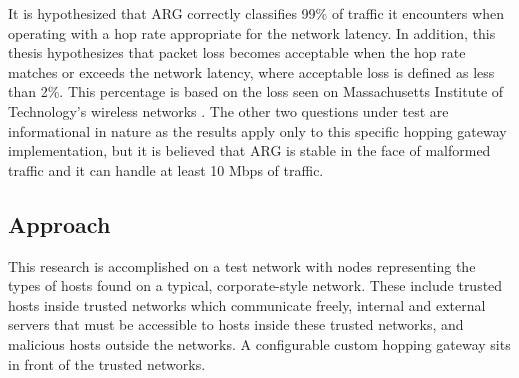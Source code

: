 

\par It is hypothesized that \ac{ARG} correctly classifies 99\% of traffic it encounters when operating with a hop rate appropriate for the network latency. In addition, this thesis hypothesizes that packet loss becomes acceptable when the hop rate matches or exceeds the network latency, where acceptable loss is defined as less than 2\%. This percentage is based on the loss seen on Massachusetts Institute of Technology's wireless networks \cite{MITWifiLoss}. The other two questions under test are informational in nature as the results apply only to this specific hopping gateway implementation, but it is believed that \ac{ARG} is stable in the face of malformed traffic and it can handle at least 10 \ac{Mbps} of traffic. 

\subsection{Approach}
\label{sec:approach}
\par This research is accomplished on a test network with nodes representing the types of hosts found on a typical, corporate-style network. These include trusted hosts inside trusted networks which communicate freely, internal and external servers that must be accessible to hosts inside these trusted networks, and malicious hosts outside the networks. A configurable custom hopping gateway sits in front of the trusted networks. 

